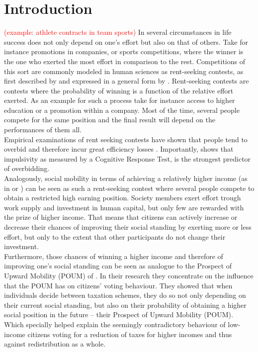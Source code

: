 \chapter{Introduction}
\thispagestyle{fancy}
\label{ch:intro}

\textcolor{red}{(example: athlete contracts in team sports)}
In several circumstances in life success does not only depend on one's effort but also on that of others. Take for instance promotions in companies, or sports competitions, where the winner is the one who exerted the most effort in comparison to the rest. Competitions of this sort are commonly modeled in human sciences as rent-seeking contests, as first described by \cite{tullock1980}  and expressed in a general form by \cite{sheremeta2010a}. Rent-seeking contests are contests where the probability of winning is a function of the relative effort exerted. As an example for such a process take for instance access to higher education or a promotion within a company. Most of the time, several people compete for the same position and the final result will depend on the performances of them all.\\

Empirical examinations of rent seeking contests have shown that people tend to overbid and therefore incur great efficiency losses \citep{sheremeta2016, chowdhury2014, konrad2009, dechenaux2015}. Importantly, \cite{sheremeta2016} shows that impulsivity as measured by a Cognitive Response Test, is the strongest predictor of overbidding.\\

Analogously, social mobility in terms of achieving a relatively higher income (as in \cite{fields1996} or \cite{fields1999}) can be seen as such a rent-seeking contest where several people compete to obtain a restricted high earning position. Society members exert effort trough work supply and investment in human capital, but only few are rewarded with the prize of higher income. That means that citizens can actively increase or decrease their chances of improving their social standing by exerting more or less effort, but only to the extent that other participants do not change their investment.\\

Furthermore, those chances of winning a higher income and therefore of improving one's social standing can be seen as analogue to the Prospect of Upward Mobility (POUM) of \cite{benabou2001}. In their research they concentrate on the influence that the POUM has on citizens' voting behaviour. They showed that when individuals decide between taxation schemes, they do so not only depending on their current social standing, but also on their probability of obtaining a higher social position in the future -- their Prospect of Upward Mobility (POUM). Which specially helped explain the seemingly contradictory behaviour of low-income citizens voting for a reduction of taxes for higher incomes and thus against redistribution as a whole.\\

